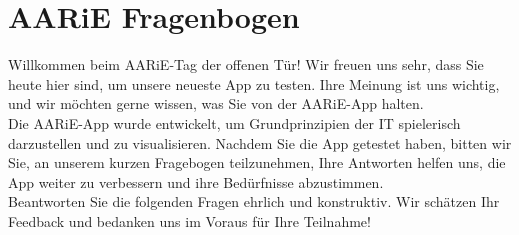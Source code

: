 \documentclass{article}
\begin{document}
\thispagestyle{empty} %

\section{AARiE Fragenbogen}

Willkommen beim AARiE-Tag der offenen Tür! Wir freuen uns sehr, dass Sie heute hier sind, um unsere neueste App zu testen. Ihre Meinung ist uns wichtig, und wir möchten gerne wissen, was Sie von der AARiE-App halten.\\

Die AARiE-App wurde entwickelt, um Grundprinzipien der IT spielerisch darzustellen und zu visualisieren. Nachdem Sie die App getestet haben, bitten wir Sie, an unserem kurzen Fragebogen teilzunehmen, Ihre Antworten helfen uns, die App weiter zu verbessern und ihre Bedürfnisse abzustimmen. \\

Beantworten Sie die folgenden Fragen ehrlich und konstruktiv. Wir schätzen Ihr Feedback und bedanken uns im Voraus für Ihre Teilnahme!
\end{document}
